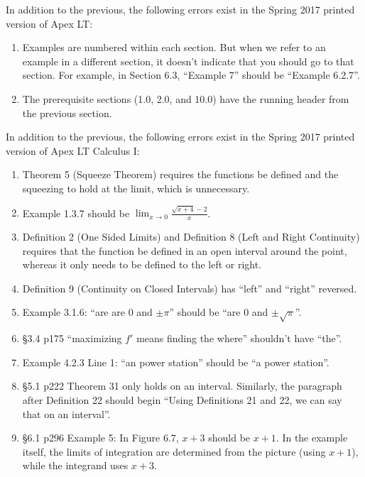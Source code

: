 \documentclass{amsart}
\newcommand{\ds}{\displaystyle}
\begin{document}

\newcommand{\springerrors}{%
In addition to the previous, the following errors exist in the Spring 2017 printed version of Apex LT:
\begin{enumerate}
\item Examples are numbered within each section.  But when we refer to an example in a different section, it doesn't indicate that you should go to that section.  For example, in Section 6.3, ``Example 7'' should be ``Example 6.2.7''.
\item The prerequisite sections (1.0, 2.0, and 10.0) have the running header from the previous section.
\end{enumerate}} %

\springerrors

In addition to the previous, the following errors exist in the Spring 2017 printed version of Apex LT Calculus I:
\begin{enumerate}
\item Theorem 5 (Squeeze Theorem) requires the functions be defined and the squeezing to hold at the limit, which is unnecessary.\vspace{-.5\baselineskip}
\item Example 1.3.7 should be $\ds \lim_{x\to 0} \frac{\sqrt{x+4}-2}{x}$.
\item Definition 2 (One Sided Limits) and Definition 8 (Left and Right Continuity) requires that the function be defined in an open interval around the point, whereas it only needs to be defined to the left or right.
\item Definition 9 (Continuity on Closed Intervals) has ``left'' and ``right'' reversed.
\item Example 3.1.6: ``are are $0$ and $\pm\pi$'' should be ``are $0$ and $\pm\sqrt\pi$''.
\item \S3.4 p175 ``maximizing $f'$ means finding the where'' shouldn't have ``the''.
\item Example 4.2.3 Line 1: ``an power station'' should be ``a power station''.
\item \S5.1 p222 Theorem 31 only holds on an interval.  Similarly, the paragraph after Definition 22 should begin ``Using Definitions 21 and 22, we can say that on an interval''.
\item \S6.1 p296 Example 5: In Figure 6.7, $x+3$ should be $x+1$.  In the example itself, the limits of integration are determined from the picture (using $x+1$), while the integrand uses $x+3$.
\label{2017-01-00Iplus}
\end{enumerate}
\end{document}
